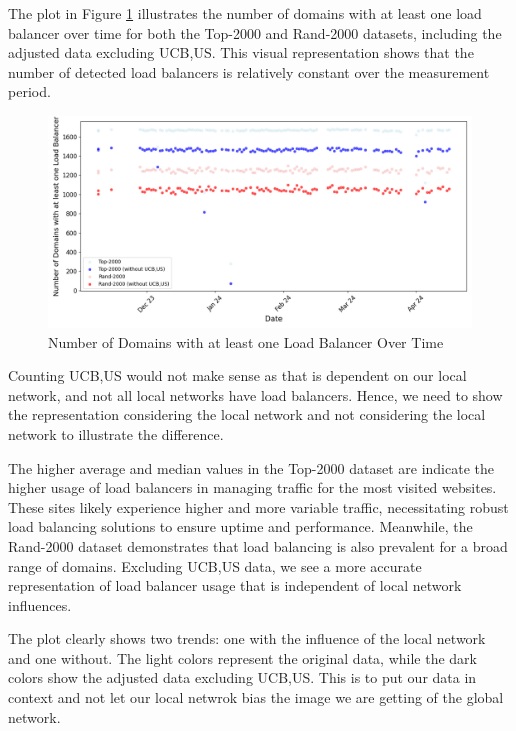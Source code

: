 \documentclass[12pt]{cwru_thesis}
\begin{document}
The plot in Figure \ref{fig:stat_plot} illustrates the number of domains with at least one load balancer over time for both the Top-2000 and Rand-2000 datasets, including the adjusted data excluding UCB,US. This visual representation shows that the number of detected load balancers is relatively constant over the measurement period.

\begin{figure}[h]
\centering
\includegraphics[width=\textwidth]{figures/scatter_plot_domains.png}
\caption{Number of Domains with at least one Load Balancer Over Time}
\label{fig:stat_plot}
\end{figure}

Counting UCB,US would not make sense as that is dependent on our local network, and not all local networks have load balancers. Hence, we need to show the representation considering the local network and not considering the local network to illustrate the difference. 

The higher average and median values in the Top-2000 dataset are indicate the higher usage of load balancers in managing traffic for the most visited websites. These sites likely experience higher and more variable traffic, necessitating robust load balancing solutions to ensure uptime and performance. Meanwhile, the Rand-2000 dataset demonstrates that load balancing is also prevalent for a broad range of domains. Excluding UCB,US data, we see a more accurate representation of load balancer usage that is independent of local network influences.

The plot clearly shows two trends: one with the influence of the local network and one without. The light colors represent the original data, while the dark colors show the adjusted data excluding UCB,US. This is to put our data in context and not let our local netwrok bias the image we are getting of the global network. 
\end{document}
